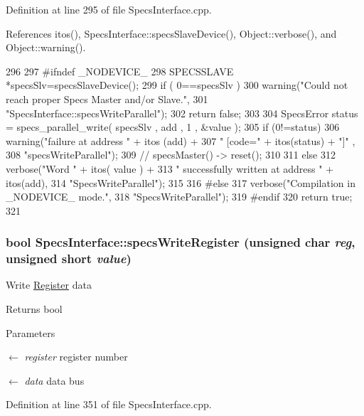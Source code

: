 Definition at line 295 of file SpecsInterface.cpp.

References itos(), SpecsInterface::specsSlaveDevice(), Object::verbose(), and Object::warning().


\begin{DoxyCode}
296                                                 {
297 #ifndef _NODEVICE_
298   SPECSSLAVE *specsSlv=specsSlaveDevice();
299   if ( 0==specsSlv ){
300     warning("Could not reach proper Specs Master and/or Slave.",
301             "SpecsInterface::specsWriteParallel");
302     return false;
303   }
304   SpecsError status = specs_parallel_write( specsSlv , add , 1 , &value );
305   if (0!=status){
306     warning("failure at address " + itos (add) +
307             " [code=" + itos(status) + "]" ,
308             "specsWriteParallel");
309     //    specsMaster() -> reset();
310   }
311   else {
312     verbose("Word " + itos( value ) +
313             " successfully written at address " + itos(add),
314             "SpecsWriteParallel");
315   }
316 #else
317   verbose("Compilation in _NODEVICE_ mode.",
318           "SpecsWriteParallel");
319 #endif
320   return true;
321 }
\end{DoxyCode}
\hypertarget{classSpecsInterface_ab70adfa5ad87097469c7485126a3c61a}{
\subsubsection[{specsWriteRegister}]{\setlength{\rightskip}{0pt plus 5cm}bool SpecsInterface::specsWriteRegister (unsigned char {\em reg}, \/  unsigned short {\em value})}}
\label{classSpecsInterface_ab70adfa5ad87097469c7485126a3c61a}
Write \hyperlink{classRegister}{Register} data

\begin{DoxyReturn}{Returns}
bool 
\end{DoxyReturn}

\begin{DoxyParams}{Parameters}
\item[\mbox{$\leftarrow$} {\em register}]register number \item[\mbox{$\leftarrow$} {\em data}]data bus \end{DoxyParams}


Definition at line 351 of file SpecsInterface.cpp.

